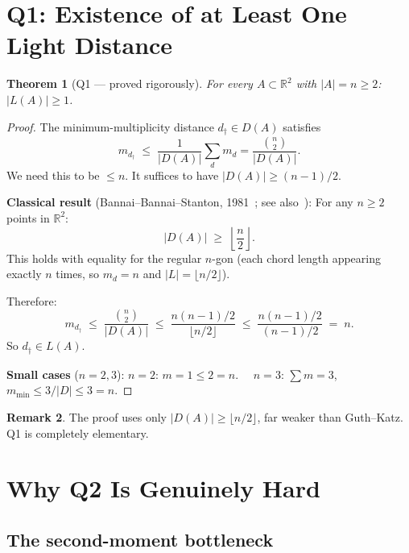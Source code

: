 \documentclass[12pt,a4paper]{amsart}
\def\cL{\textit{L}}\def\cH{\textit{H}}%
\theoremstyle{plain}
\newtheorem{theorem}{Theorem}[section]
\theoremstyle{definition}
\newtheorem{remark}[theorem]{Remark}
\newcommand{\R}{\mathbb{R}}
\newcommand{\cL}{\mathcal{L}}
\newcommand{\cH}{\mathcal{H}}
\begin{document}
\section{Q1: Existence of at Least One Light Distance}
\label{sec:Q1}

\begin{mdframed}[style=mainresult]
\begin{theorem}[Q1 --- proved rigorously]
\label{thm:Q1}
For every $A\subset\R^2$ with $|A|=n\ge 2$: $|\cL(A)|\ge 1$.
\end{theorem}
\end{mdframed}

\begin{proof}
The minimum-multiplicity distance $d_\dag\in D(A)$ satisfies
\[
  m_{d_\dag} \;\le\; \frac{1}{|D(A)|}\sum_d m_d
  = \frac{\binom{n}{2}}{|D(A)|}.
\]
We need this to be $\le n$.  It suffices to have $|D(A)|\ge(n-1)/2$.

\textbf{Classical result} (Bannai--Bannai--Stanton, 1981~\cite{BBS81}; see
also~\cite{BMP}):
For any $n\ge 2$ points in $\R^2$:
\[
  |D(A)| \;\ge\; \left\lfloor\frac{n}{2}\right\rfloor.
\]
This holds with equality for the regular $n$-gon (each chord
length appearing exactly $n$ times, so $m_d=n$ and
$|\cL|=\lfloor n/2\rfloor$).

Therefore:
\[
  m_{d_\dag} \;\le\; \frac{\binom{n}{2}}{|D(A)|}
  \;\le\; \frac{n(n-1)/2}{\lfloor n/2\rfloor}
  \;\le\; \frac{n(n-1)/2}{(n-1)/2} \;=\; n.
\]
So $d_\dag\in\cL(A)$.

\textbf{Small cases} ($n=2,3$):
$n=2$: $m=1\le 2=n$. \checkmark\ \ $n=3$: $\sum m=3$, $m_{\min}\le 3/|D|\le 3=n$. \checkmark
\end{proof}

\begin{remark}
The proof uses only $|D(A)|\ge\lfloor n/2\rfloor$, far weaker than
Guth--Katz.  Q1 is completely elementary.
\end{remark}

\section{Why Q2 Is Genuinely Hard}
\label{sec:Q2hard}

\subsection{The second-moment bottleneck}
\end{document}
